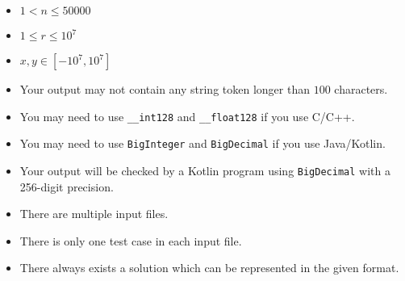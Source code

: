 \begin{itemize}
	\tightlist
\item $1< n\le 50000$
\item $1\le r\le 10^7$
\item $x,y \in [-10^7,10^7]$
\item Your output may not contain any string token longer than $100$ characters. 
\item You may need to use \verb+__int128+ and \verb+__float128+ if you use
      C/C++.
\item You may need to use \verb+BigInteger+ and \verb+BigDecimal+ if you use
      Java/Kotlin.
\item Your output will be checked by a Kotlin program using \verb+BigDecimal+
      with a 256-digit precision.
\item There are multiple input files.
\item There is only one test case in each input file.
\item There always exists a solution which can
      be represented in the given format.
\end{itemize}

